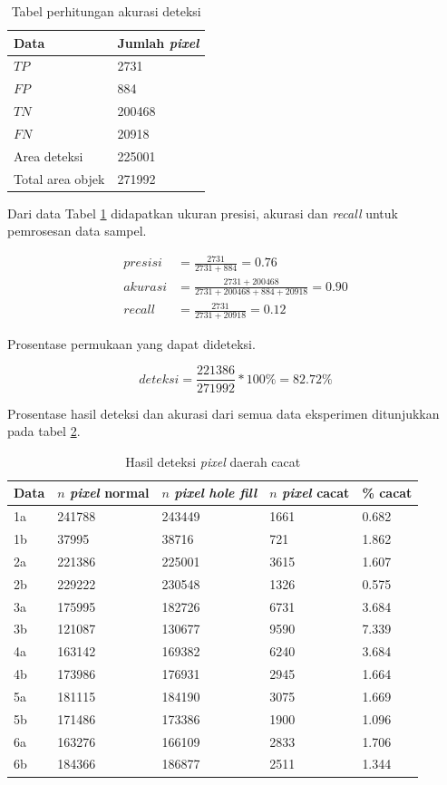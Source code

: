 \documentclass[laporan.tex]{subfiles}
\begin{document}
\begin{table}[h!]
\centering
\begin{tabular}{|l|l|}
\hline
Data & Jumlah \emph{pixel} \\
\hline
$TP$ & 2731 \\
$FP$ & 884 \\
$TN$ & 200468 \\
$FN$ & 20918 \\
Area deteksi & 225001 \\
Total area objek & 271992 \\
\hline
\end{tabular}
\caption{Tabel perhitungan akurasi deteksi}
\label{table:confuse3}
\end{table}

Dari data Tabel \ref{table:confuse3} didapatkan ukuran presisi, akurasi dan \emph{recall} untuk pemrosesan data sampel.

\begin{align*}
presisi & = \frac{2731}{2731 + 884}  = 0.76 \\
akurasi & = \frac{2731+200468}{2731+200468+884+20918}  = 0.90 \\
recall & = \frac{2731}{2731+20918}  = 0.12
\end{align*}

Prosentase permukaan yang dapat dideteksi.

\begin{equation*}
deteksi =\frac{221386}{271992} \ast 100\% = 82.72\%
\end{equation*}

Prosentase hasil deteksi dan akurasi dari semua data eksperimen ditunjukkan pada tabel \ref{table:detrecap}.

\begin{table}[h!]
\centering
\begin{tabular}{|l|l|l|l|l|}
\hline
Data & $n$ \emph{pixel} normal & $n$ \emph{pixel} \emph{hole fill} & $n$ \emph{pixel} cacat & \% cacat \\
\hline
1a & 241788&243449&1661&0.682\\
1b & 37995&38716&721&1.862\\
2a & 221386&225001&3615&1.607\\
2b & 229222&230548&1326&0.575\\
3a & 175995&182726&6731&3.684\\
3b & 121087&130677&9590&7.339\\
4a & 163142&169382&6240&3.684\\
4b & 173986&176931&2945&1.664\\
5a & 181115&184190&3075&1.669\\
5b & 171486&173386&1900&1.096 \\
6a & 163276&166109&2833&1.706 \\
6b & 184366&186877&2511&1.344 \\
\hline
\end{tabular}
\caption{Hasil deteksi \emph{pixel} daerah cacat}
\label{table:detrecap}
\end{table}
\end{document}
